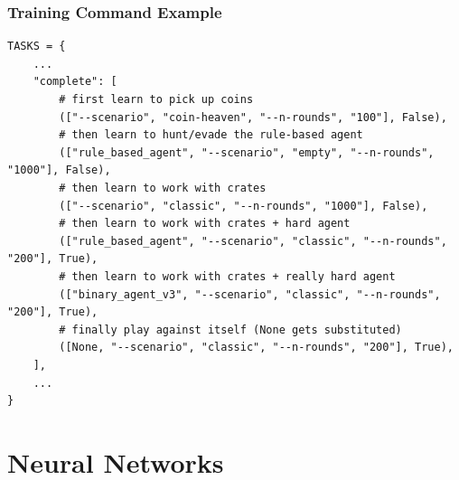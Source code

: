 \documentclass{beamer}
\begin{document}
\begin{frame}[fragile]
	\frametitle{Training Command Example}
	\pause

\fontsize{7}{9}
\begin{verbatim}
TASKS = {
    ...
    "complete": [
        # first learn to pick up coins
        (["--scenario", "coin-heaven", "--n-rounds", "100"], False),
        # then learn to hunt/evade the rule-based agent
        (["rule_based_agent", "--scenario", "empty", "--n-rounds", "1000"], False),
        # then learn to work with crates
        (["--scenario", "classic", "--n-rounds", "1000"], False),
        # then learn to work with crates + hard agent
        (["rule_based_agent", "--scenario", "classic", "--n-rounds", "200"], True),
        # then learn to work with crates + really hard agent
        (["binary_agent_v3", "--scenario", "classic", "--n-rounds", "200"], True),
        # finally play against itself (None gets substituted)
        ([None, "--scenario", "classic", "--n-rounds", "200"], True),
    ],
    ...
}
\end{verbatim}
\end{frame}

\section{Neural Networks}
\end{document}
